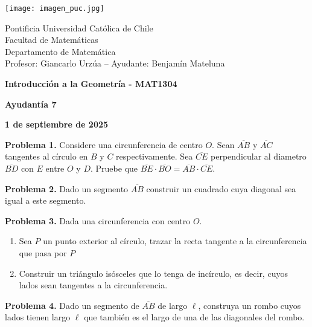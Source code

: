 \documentclass{article}
\begin{document}
\begin{minipage}{2.5cm}
    \texttt{[image: imagen\_puc.jpg]}
\end{minipage}
\begin{minipage}{14cm}
    {\sc Pontificia Universidad Católica de Chile\\
    Facultad de Matemáticas\\
    Departamento de Matemática\\
    Profesor: Giancarlo Urzúa -- Ayudante: Benjamín Mateluna}
\end{minipage}
\vspace{1ex}

{\centerline{\bf Introducción a la Geometría - MAT1304}
\centerline{\bf Ayudantía 7}}
\centerline{\bf 1 de septiembre de 2025}

\vspace{1cm}
\noindent\textbf{Problema 1.} Considere una circunferencia de centro $O$. Sean $\overline{AB}$ y 
$\overline{AC}$ tangentes al círculo en $B$ y $C$ respectivamente. Sea $\overline{CE}$ 
perpendicular al diametro $\overline{BD}$ con $E$ entre $O$ y $D$. Pruebe que 
$\overline{BE}\cdot\overline{BO}=\overline{AB}\cdot\overline{CE}$.

\vspace{5mm}
\noindent\textbf{Problema 2.} Dado un segmento $\overline{AB}$ construir un cuadrado cuya diagonal
sea igual a este segmento.

\vspace{5mm}
\noindent\textbf{Problema 3.} Dada una circunferencia con centro $O$.
\begin{enumerate}
    \item Sea $P$ un punto exterior al círculo, trazar la recta tangente a la circunferencia que 
    pasa por $P$

    \item Construir un triángulo isósceles que lo tenga de incírculo, es decir, cuyos lados sean 
    tangentes a la circunferencia.
\end{enumerate}

\vspace{5mm}
\noindent\textbf{Problema 4.} Dado un segmento de $\overline{AB}$ de largo $\ell$, construya un 
rombo cuyos lados tienen largo $\ell$ que también es el largo de una de las diagonales del rombo.

\end{document}
